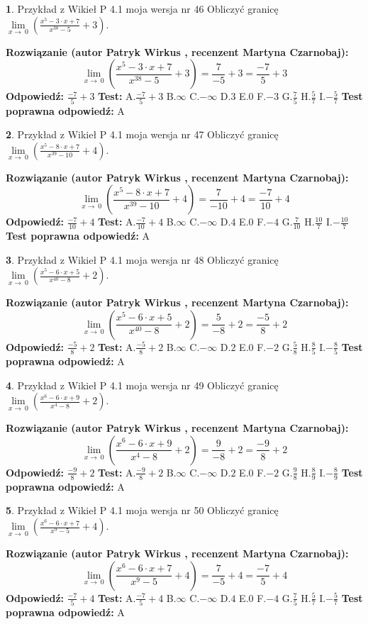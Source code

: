 \documentclass[12pt, a4paper]{article}
\theoremstyle{definition} %
\newtheorem{zad}{}
\newcommand{\zadStart}[1]{\begin{zad}#1\newline}
\newcommand{\zadStop}{\end{zad}}
\newcommand{\rozwStart}[2]{\noindent \textbf{Rozwiązanie (autor #1 , recenzent #2): }\newline}
\newcommand{\rozwStop}{\newline}
\newcommand{\odpStart}{\noindent \textbf{Odpowiedź:}\newline}
\newcommand{\odpStop}{\newline}
\newcommand{\testStart}{\noindent \textbf{Test:}\newline}
\newcommand{\testStop}{\newline}
\newcommand{\kluczStart}{\noindent \textbf{Test poprawna odpowiedź:}\newline}
\newcommand{\kluczStop}{\newline}
\begin{document}
\zadStart{Przykład z Wikieł P 4.1 moja wersja nr 46}
Obliczyć granicę $\lim\limits_{x\to\ 0}(\frac{x^{5}-3 \cdot x +7}{x^{38}-5}+3)$.
\zadStop
\rozwStart{Patryk Wirkus}{Martyna Czarnobaj}
$$\lim\limits_{x\to\ 0}(\frac{x^{5}-3 \cdot x +7}{x^{38}-5}+3)=\frac{7}{-5}+3=\frac{-7}{5}+3$$
\rozwStop
\odpStart
$\frac{-7}{5}+3$
\odpStop
\testStart
A.$\frac{-7}{5}+3$
B.$\infty$
C.$-\infty$
D.$3$
E.$0$
F.$-3$
G.$\frac{7}{5}$
H.$\frac{5}{7}$
I.$-\frac{5}{7}$
\testStop
\kluczStart
A
\kluczStop



\zadStart{Przykład z Wikieł P 4.1 moja wersja nr 47}
Obliczyć granicę $\lim\limits_{x\to\ 0}(\frac{x^{5}-8 \cdot x +7}{x^{39}-10}+4)$.
\zadStop
\rozwStart{Patryk Wirkus}{Martyna Czarnobaj}
$$\lim\limits_{x\to\ 0}(\frac{x^{5}-8 \cdot x +7}{x^{39}-10}+4)=\frac{7}{-10}+4=\frac{-7}{10}+4$$
\rozwStop
\odpStart
$\frac{-7}{10}+4$
\odpStop
\testStart
A.$\frac{-7}{10}+4$
B.$\infty$
C.$-\infty$
D.$4$
E.$0$
F.$-4$
G.$\frac{7}{10}$
H.$\frac{10}{7}$
I.$-\frac{10}{7}$
\testStop
\kluczStart
A
\kluczStop



\zadStart{Przykład z Wikieł P 4.1 moja wersja nr 48}
Obliczyć granicę $\lim\limits_{x\to\ 0}(\frac{x^{5}-6 \cdot x +5}{x^{40}-8}+2)$.
\zadStop
\rozwStart{Patryk Wirkus}{Martyna Czarnobaj}
$$\lim\limits_{x\to\ 0}(\frac{x^{5}-6 \cdot x +5}{x^{40}-8}+2)=\frac{5}{-8}+2=\frac{-5}{8}+2$$
\rozwStop
\odpStart
$\frac{-5}{8}+2$
\odpStop
\testStart
A.$\frac{-5}{8}+2$
B.$\infty$
C.$-\infty$
D.$2$
E.$0$
F.$-2$
G.$\frac{5}{8}$
H.$\frac{8}{5}$
I.$-\frac{8}{5}$
\testStop
\kluczStart
A
\kluczStop



\zadStart{Przykład z Wikieł P 4.1 moja wersja nr 49}
Obliczyć granicę $\lim\limits_{x\to\ 0}(\frac{x^{6}-6 \cdot x +9}{x^{4}-8}+2)$.
\zadStop
\rozwStart{Patryk Wirkus}{Martyna Czarnobaj}
$$\lim\limits_{x\to\ 0}(\frac{x^{6}-6 \cdot x +9}{x^{4}-8}+2)=\frac{9}{-8}+2=\frac{-9}{8}+2$$
\rozwStop
\odpStart
$\frac{-9}{8}+2$
\odpStop
\testStart
A.$\frac{-9}{8}+2$
B.$\infty$
C.$-\infty$
D.$2$
E.$0$
F.$-2$
G.$\frac{9}{8}$
H.$\frac{8}{9}$
I.$-\frac{8}{9}$
\testStop
\kluczStart
A
\kluczStop



\zadStart{Przykład z Wikieł P 4.1 moja wersja nr 50}
Obliczyć granicę $\lim\limits_{x\to\ 0}(\frac{x^{6}-6 \cdot x +7}{x^{9}-5}+4)$.
\zadStop
\rozwStart{Patryk Wirkus}{Martyna Czarnobaj}
$$\lim\limits_{x\to\ 0}(\frac{x^{6}-6 \cdot x +7}{x^{9}-5}+4)=\frac{7}{-5}+4=\frac{-7}{5}+4$$
\rozwStop
\odpStart
$\frac{-7}{5}+4$
\odpStop
\testStart
A.$\frac{-7}{5}+4$
B.$\infty$
C.$-\infty$
D.$4$
E.$0$
F.$-4$
G.$\frac{7}{5}$
H.$\frac{5}{7}$
I.$-\frac{5}{7}$
\testStop
\kluczStart
A
\kluczStop
\end{document}
